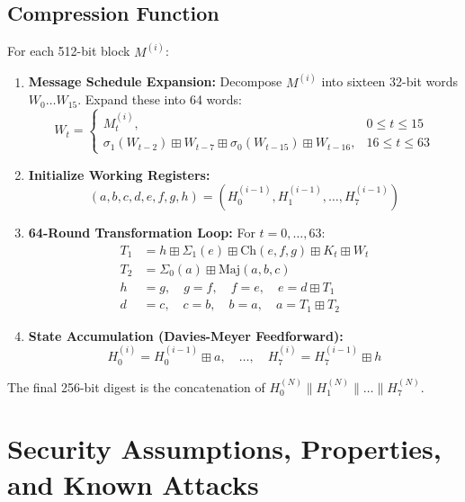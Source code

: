 \subsection{Compression Function}
For each 512-bit block $M^{(i)}$:
\begin{enumerate}
    \item \textbf{Message Schedule Expansion:} Decompose $M^{(i)}$ into sixteen 32-bit words $W_0 \dots W_{15}$. Expand these into 64 words:
    \begin{equation}
    W_t = 
    \begin{cases}
    M_t^{(i)}, & 0 \le t \le 15 \\
    \sigma_1(W_{t-2}) \boxplus W_{t-7} \boxplus \sigma_0(W_{t-15}) \boxplus W_{t-16}, & 16 \le t \le 63
    \end{cases}
    \end{equation}
    \item \textbf{Initialize Working Registers:}
    \begin{equation}
    (a, b, c, d, e, f, g, h) = (H_0^{(i-1)}, H_1^{(i-1)}, \dots, H_7^{(i-1)})
    \end{equation}
    \item \textbf{64-Round Transformation Loop:} For $t = 0, \dots, 63$:
    \begin{align}
    T_1 &= h \boxplus \Sigma_1(e) \boxplus \text{Ch}(e, f, g) \boxplus K_t \boxplus W_t \\
    T_2 &= \Sigma_0(a) \boxplus \text{Maj}(a, b, c) \\
    h &= g, \quad g = f, \quad f = e, \quad e = d \boxplus T_1 \\
    d &= c, \quad c = b, \quad b = a, \quad a = T_1 \boxplus T_2
    \end{align}
    \item \textbf{State Accumulation (Davies-Meyer Feedforward):}
    \begin{equation}
    H_0^{(i)} = H_0^{(i-1)} \boxplus a, \quad \dots, \quad H_7^{(i)} = H_7^{(i-1)} \boxplus h
    \end{equation}
\end{enumerate}
The final 256-bit digest is the concatenation of $H_0^{(N)} \parallel H_1^{(N)} \parallel \dots \parallel H_7^{(N)}$.

\section{Security Assumptions, Properties, and Known Attacks}
